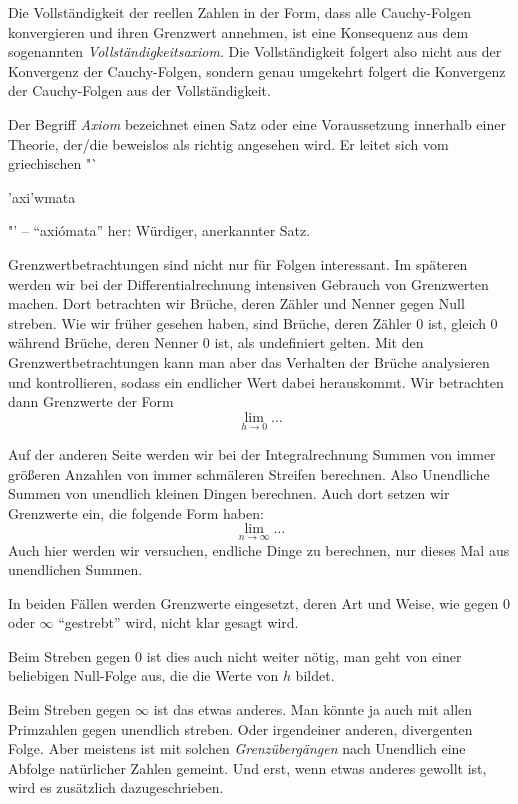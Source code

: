 Die Vollständigkeit der reellen Zahlen in der Form, dass alle Cauchy-Folgen konvergieren und ihren Grenzwert annehmen, ist eine Konsequenz aus dem sogenannten \emph{Vollständigkeitsaxiom}. Die Vollständigkeit folgert also nicht aus der Konvergenz der Cauchy-Folgen, sondern genau umgekehrt folgert die Konvergenz der Cauchy-Folgen aus der Vollständigkeit. 


Der Begriff \emph{Axiom} bezeichnet einen Satz oder eine Voraussetzung innerhalb einer Theorie, der/die beweislos als richtig angesehen wird. Er leitet sich vom griechischen "`\begin{greek}'axi'wmata\end{greek}"' -- "`axi\'omata"' her: Würdiger, anerkannter Satz.

\bigskip 

Grenzwertbetrachtungen sind nicht nur für Folgen interessant. Im späteren werden wir bei der Differentialrechnung intensiven Gebrauch von Grenzwerten machen. Dort betrachten wir Brüche, deren Zähler und Nenner gegen Null streben. Wie wir früher gesehen haben, sind Brüche, deren Zähler 0 ist, gleich 0 während Brüche, deren Nenner 0 ist, als undefiniert gelten. Mit den Grenzwertbetrachtungen kann man aber das Verhalten der Brüche analysieren und kontrollieren, sodass ein endlicher Wert dabei herauskommt. Wir betrachten dann Grenzwerte der Form
\begin{equation}
\lim\limits_{h \rightarrow 0} \dots
\end{equation}

Auf der anderen Seite werden wir bei der Integralrechnung Summen von immer größeren Anzahlen von immer schmäleren Streifen berechnen. Also Unendliche Summen von unendlich kleinen Dingen berechnen. Auch dort setzen wir Grenzwerte ein, die folgende Form haben:
\begin{equation}
\lim\limits_{n \rightarrow \infty} \dots
\end{equation}
Auch hier werden wir versuchen, endliche Dinge zu berechnen, nur dieses Mal aus unendlichen Summen. 

In beiden Fällen werden Grenzwerte eingesetzt, deren Art und Weise, wie gegen $0$ oder $\infty$ "`gestrebt"' wird, nicht klar gesagt wird. 

Beim Streben gegen $0$ ist dies auch nicht weiter nötig, man geht von einer beliebigen Null-Folge aus, die die Werte von $h$ bildet. 

Beim Streben gegen $\infty$ ist das etwas anderes. Man könnte ja auch mit allen Primzahlen gegen unendlich streben. Oder irgendeiner anderen, divergenten Folge. Aber meistens ist mit solchen \emph{Grenzübergängen} nach Unendlich eine Abfolge natürlicher Zahlen gemeint. Und erst, wenn etwas anderes gewollt ist, wird es zusätzlich dazugeschrieben.

